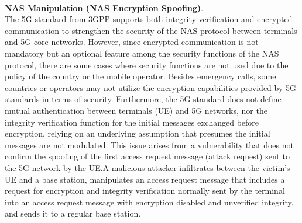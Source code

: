 \documentclass[english]{article}
\begin{document}
\\
\textbf{NAS Manipulation (NAS Encryption Spoofing)}. \\
The 5G standard from 3GPP supports both integrity verification and encrypted
communication to strengthen the security of the NAS protocol between terminals
and 5G core networks. However, since encrypted communication is not mandatory
but an optional feature among the security functions of the NAS protocol,
there are some cases where security functions are not used due to the policy
of the country or the mobile operator. Besides emergency calls, some countries
or operators may not utilize the encryption capabilities provided by 5G
standards in terms of security. Furthermore, the 5G standard does not define
mutual authentication between terminals (UE) and 5G networks, nor the integrity
verification function for the initial messages exchanged before encryption,
relying on an underlying assumption that presumes the initial messages are not
modulated. This issue arises from a vulnerability that does not confirm the
spoofing of the first access request message (attack request) sent to the 5G
network by the UE.\@ A malicious attacker infiltrates between the victim's UE
and a base station, manipulates an access request message that includes a request
for encryption and integrity verification normally sent by the terminal into an
access request message with encryption disabled and unverified integrity, and
sends it to a regular base station.
\end{document}
